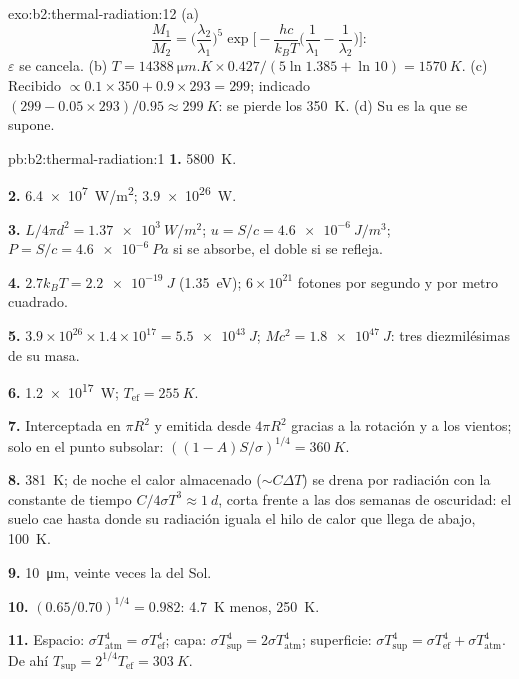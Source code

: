 \begin{solution}{exo:b2:thermal-radiation:12}
(a)
\[
\frac{M_1}{M_2} = \Big(\frac{\lambda_2}{\lambda_1}\Big)^5\exp\Big[-\frac{hc}{k_BT}\Big(\frac{1}{\lambda_1} - \frac{1}{\lambda_2}\Big)\Big] :
\]
$\varepsilon$ se cancela. (b) $T = \qty{14388}{\micro m.K} \times 0.427/(5\ln 1.385 +
\ln 10) = \qty{1570}{K}$. (c) Recibido $\propto 0.1 \times 350 + 0.9 \times 293 =
299$; indicado $(299 - 0.05 \times 293)/0.95 \approx \qty{299}{K}$: se pierde los
\qty{350}{K}. (d) Su  es la que se supone.
\end{solution}

\begin{solution}{pb:b2:thermal-radiation:1}
\textbf{1.} \qty{5800}{K}.

\textbf{2.} \qty{6.4e7}{W/m^2}; \qty{3.9e26}{W}.

\textbf{3.} $L/4\pi d^2 = \qty{1.37e3}{W/m^2}$; $u = S/c = \qty{4.6e-6}{J/m^3}$;
$P = S/c = \qty{4.6e-6}{Pa}$ si se absorbe, el doble si se refleja.

\textbf{4.} $2.7k_BT = \qty{2.2e-19}{J}$ (\qty{1.35}{eV}); $6 \times 10^{21}$
fotones por segundo y por metro cuadrado.

\textbf{5.} $3.9 \times 10^{26} \times 1.4 \times 10^{17} = \qty{5.5e43}{J}$; $Mc^2 =
\qty{1.8e47}{J}$: tres diezmilésimas de su masa.

\textbf{6.} \qty{1.2e17}{W}; $T_{\text{ef}} = \qty{255}{K}$.

\textbf{7.} Interceptada en $\pi R^2$ y emitida desde $4\pi R^2$ gracias a
la rotación y a los vientos; solo en el punto subsolar: $((1 - A)S/\sigma)^{1/4} =
\qty{360}{K}$.

\textbf{8.} \qty{381}{K}; de noche el calor almacenado ($\sim C\Delta T$) se drena por
radiación con la constante de tiempo $C/4\sigma T^3 \approx \qty{1}{d}$, corta
frente a las dos semanas de oscuridad: el suelo cae hasta donde su
radiación iguala el hilo de calor que llega de abajo, \qty{100}{K}.

\textbf{9.} \qty{10}{\micro m}, veinte veces la del Sol.

\textbf{10.} $(0.65/0.70)^{1/4} = 0.982$: \qty{4.7}{K} menos, \qty{250}{K}.

\textbf{11.} Espacio: $\sigma T_{\text{atm}}^4 = \sigma T_{\text{ef}}^4$; capa: $\sigma
T_{\text{sup}}^4 = 2\sigma T_{\text{atm}}^4$; superficie: $\sigma T_{\text{sup}}^4 = \sigma
T_{\text{ef}}^4 + \sigma T_{\text{atm}}^4$. De ahí $T_{\text{sup}} = 2^{1/4}T_{\text{ef}} = \qty{303}{K}$.


\end{solution}
